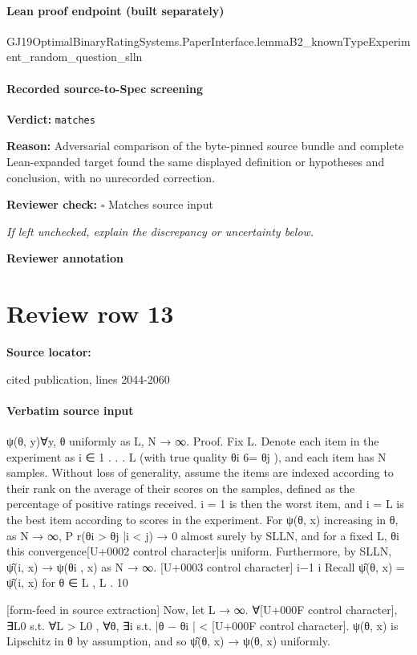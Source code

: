 \documentclass[10pt]{article}
\newcommand{\reviewerbox}{%
  \par\noindent\fbox{\parbox{0.96\linewidth}{\rule{0pt}{0.38in}}}\par
}
\newcommand{\reviewmatch}[1]{%
  \par\noindent\textbf{Reviewer check:} $\square$\; #1\par
  \noindent\emph{If left unchecked, explain the discrepancy or uncertainty below.}\par
}
\begin{document}
\paragraph{Lean proof endpoint (built separately)}\begin{ReviewVerbatim}
GJ19OptimalBinaryRatingSystems.PaperInterface.lemmaB2_knownTypeExperiment_random_question_slln
\end{ReviewVerbatim}

\paragraph{Recorded source-to-Spec screening}
\textbf{Verdict:} \texttt{matches}
\\
{\raggedright
\textbf{Reason:} Adversarial comparison of the byte-\allowbreak{}pinned source bundle and complete Lean-\allowbreak{}expanded target found the same displayed definition or hypotheses and conclusion, with no unrecorded correction.\allowbreak{}
\par}
\reviewmatch{Matches source input}
\noindent\textbf{Reviewer annotation}\par
\reviewerbox
\clearpage
\hypertarget{source-claim-045f11cd1b489b98}{}
\section*{Review row 13}
\textbf{Source locator:} {\footnotesize\raggedright cited publication, lines 2044-\allowbreak{}2060\par}
\paragraph{Verbatim source input}
\begin{ReviewVerbatim}
ψ(θ, y)∀y, θ uniformly as L, N → ∞.
Proof. Fix L. Denote each item in the experiment as i ∈ {1 . . . L} (with true quality θi 6= θj ),
and each item has N samples. Without loss of generality, assume the items are indexed according
to their rank on the average of their scores on the samples, defined as the percentage of positive
ratings received. i = 1 is then the worst item, and i = L is the best item according to scores in the
experiment.
For ψ(θ, x) increasing in θ, as N → ∞, P r(θi > θj |i < j) → 0 almost surely by SLLN, and for
a fixed L, {θi } this convergence[U+0002 control character]is uniform.
Furthermore, by SLLN, ψ̂(i, x) → ψ(θi , x) as N → ∞.
[U+0003 control character]
i−1 i
Recall ψ̂(θ, x) = ψ̂(i, x) for θ ∈ L , L .
10


[form-feed in source extraction]
Now, let L → ∞. ∀[U+000F control character], ∃L0 s.t. ∀L > L0 , ∀θ, ∃i s.t. |θ − θi | < [U+000F control character]. ψ(θ, x) is Lipschitz in θ by
assumption, and so ψ̂(θ, x) → ψ(θ, x) uniformly.
\end{ReviewVerbatim}
\end{document}
